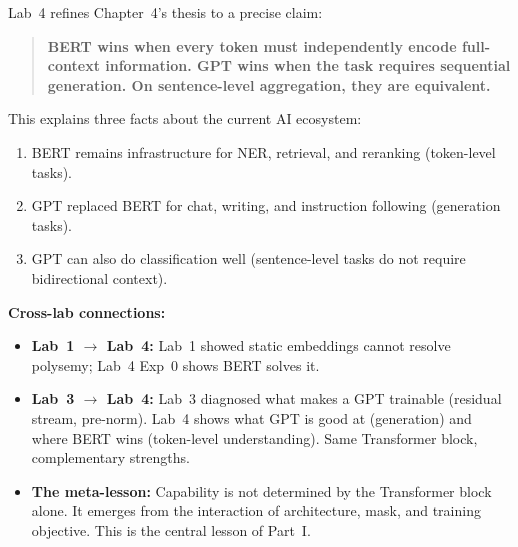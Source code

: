 Lab~4 refines Chapter~4's thesis to a precise claim:

\begin{quote}
\textbf{BERT wins when every token must independently encode full-context information. GPT wins when the task requires sequential generation. On sentence-level aggregation, they are equivalent.}
\end{quote}

This explains three facts about the current AI ecosystem:
\begin{enumerate}
\item BERT remains infrastructure for NER, retrieval, and reranking (token-level tasks).
\item GPT replaced BERT for chat, writing, and instruction following (generation tasks).
\item GPT can also do classification well (sentence-level tasks do not require bidirectional context).
\end{enumerate}

\textbf{Cross-lab connections:}
\begin{itemize}
\item \textbf{Lab~1 $\to$ Lab~4:} Lab~1 showed static embeddings cannot resolve polysemy; Lab~4 Exp~0 shows BERT solves it.
\item \textbf{Lab~3 $\to$ Lab~4:} Lab~3 diagnosed what makes a GPT trainable (residual stream, pre-norm). Lab~4 shows what GPT is good at (generation) and where BERT wins (token-level understanding). Same Transformer block, complementary strengths.
\item \textbf{The meta-lesson:} Capability is not determined by the Transformer block alone. It emerges from the interaction of architecture, mask, and training objective. This is the central lesson of Part~I.
\end{itemize}
